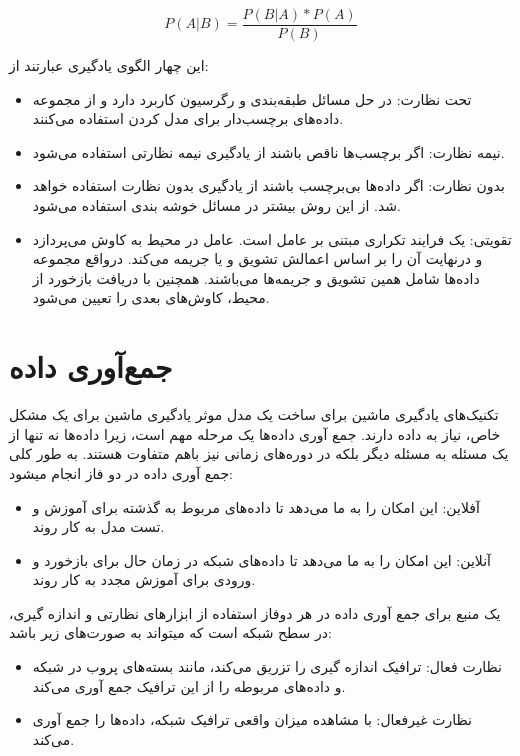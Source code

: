 \begin{equation}
    P(A|B) = \frac{P(B|A)*P(A)}{P(B)}
\end{equation}

این چهار الگوی یادگیری عبارتند از:
\begin{itemize}
\item تحت نظارت: در حل مسائل طبقه‌بندی و رگرسیون کاربرد دارد و از مجموعه داده‌های برچسب‌دار برای مدل کردن استفاده می‌کنند.
\item نیمه نظارت: اگر برچسب‌ها ناقص باشند از یادگیری نیمه نظارتی استفاده می‌شود.
\item بدون نظارت: اگر داده‌ها بی‌برچسب باشند از یادگیری بدون نظارت استفاده خواهد شد. از این روش بیشتر در مسائل خوشه بندی استفاده می‌شود.
\item تقویتی: یک فرایند تکراری مبتنی بر عامل است. عامل در محیط به کاوش می‌پردازد و درنهایت آن را بر اساس اعمالش تشویق و یا جریمه می‌کند. درواقع مجموعه داده‌ها شامل همین تشویق و جریمه‌ها می‌باشند. همچنین با دریافت بازخورد از محیط، کاوش‌های بعدی را تعیین می‌شود.
\end{itemize}



\newpage


\section{جمع‌آوری داده}

تکنیک‌های یادگیری ماشین برای ساخت یک مدل موثر یادگیری ماشین برای یک مشکل خاص، نیاز به داده دارند. جمع آوری داده‌ها یک مرحله مهم است، زیرا داده‌ها نه تنها از یک مسئله به مسئله دیگر بلکه در دوره‌های زمانی نیز باهم متفاوت هستند. به طور کلی جمع آوری داده در دو فاز انجام میشود:
\begin{itemize}
\item آفلاین: این امکان را به ما می‌دهد تا داده‌های مربوط به گذشته برای آموزش و تست مدل به کار روند.
\item آنلاین: این امکان را به ما می‌دهد تا داده‌های شبکه در زمان حال برای بازخورد و ورودی برای آموزش مجدد به کار روند.
\end{itemize}

یک منبع برای جمع آوری داده در هر دوفاز استفاده از ابزارهای نظارتی و اندازه گیری، در سطح شبکه است که میتواند به صورت‌های زیر باشد:

\begin{itemize}
\item نظارت فعال: ترافیک اندازه گیری را تزریق می‌کند، مانند بسته‌های پروب  در شبکه و داده‌های مربوطه را از این ترافیک جمع آوری می‌کند.
\item نظارت غیرفعال: با مشاهده میزان واقعی ترافیک شبکه، داده‌ها را جمع آوری می‌کند.
\end{itemize}

